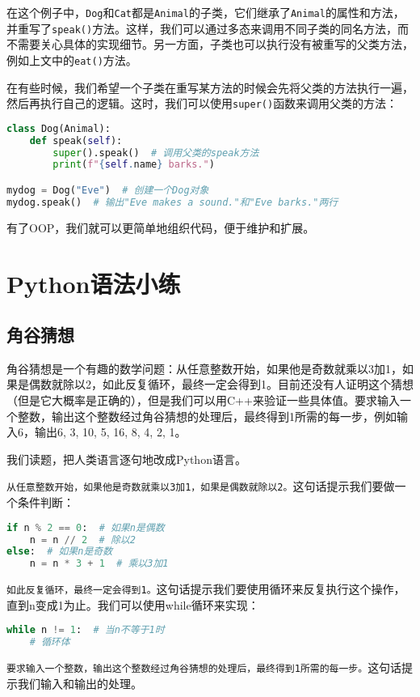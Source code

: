 \documentclass[../main.tex]{subfiles}
\begin{document}
在这个例子中，\texttt{Dog}和\texttt{Cat}都是\texttt{Animal}的子类，它们继承了\texttt{Animal}的属性和方法，并重写了\texttt{speak()}方法。这样，我们可以通过多态来调用不同子类的同名方法，而不需要关心具体的实现细节。另一方面，子类也可以执行没有被重写的父类方法，例如上文中的\texttt{eat()}方法。

在有些时候，我们希望一个子类在重写某方法的时候会先将父类的方法执行一遍，然后再执行自己的逻辑。这时，我们可以使用\texttt{super()}函数来调用父类的方法：
\begin{lstlisting}[language=python]
class Dog(Animal):
    def speak(self):
        super().speak()  # 调用父类的speak方法
        print(f"{self.name} barks.")

mydog = Dog("Eve")  # 创建一个Dog对象
mydog.speak()  # 输出"Eve makes a sound."和"Eve barks."两行
\end{lstlisting}

有了OOP，我们就可以更简单地组织代码，便于维护和扩展。

\section{Python语法小练}

\subsection{角谷猜想}
角谷猜想是一个有趣的数学问题：从任意整数开始，如果他是奇数就乘以3加1，如果是偶数就除以2，如此反复循环，最终一定会得到1。目前还没有人证明这个猜想（但是它大概率是正确的），但是我们可以用C++来验证一些具体值。要求输入一个整数，输出这个整数经过角谷猜想的处理后，最终得到1所需的每一步，例如输入6，输出6,
3, 10, 5, 16, 8, 4, 2, 1。

我们读题，把人类语言逐句地改成Python语言。

\texttt{从任意整数开始，如果他是奇数就乘以3加1，如果是偶数就除以2。}这句话提示我们要做一个条件判断：
\begin{lstlisting}[language=python]
if n % 2 == 0:  # 如果n是偶数
    n = n // 2  # 除以2
else:  # 如果n是奇数
    n = n * 3 + 1  # 乘以3加1
\end{lstlisting}
\texttt{如此反复循环，最终一定会得到1。}这句话提示我们要使用循环来反复执行这个操作，直到n变成1为止。我们可以使用while循环来实现：
\begin{lstlisting}[language=python]
while n != 1:  # 当n不等于1时
    # 循环体
\end{lstlisting}

\texttt{要求输入一个整数，输出这个整数经过角谷猜想的处理后，最终得到1所需的每一步。}这句话提示我们输入和输出的处理。
\end{document}
